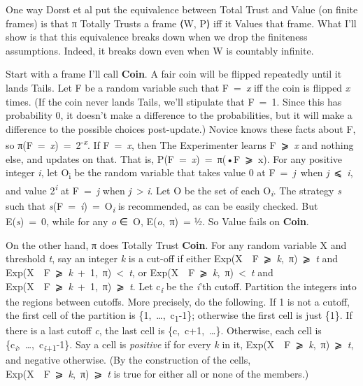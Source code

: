 \documentclass[
  10pt,
  letterpaper,
  DIV=11,
  numbers=noendperiod,
  twoside]{scrartcl}
\begin{document}
One way Dorst et al put the equivalence between Total Trust and Value
(on finite frames) is that π Totally Trusts a frame ⟨W, P⟩ iff it Values
that frame. What I'll show is that this equivalence breaks down when we
drop the finiteness assumptions. Indeed, it breaks down even when W is
countably infinite.

Start with a frame I'll call \textbf{Coin}. A fair coin will be flipped
repeatedly until it lands Tails. Let F be a random variable such that
F~=~\emph{x} iff the coin is flipped \emph{x} times. (If the coin never
lands Tails, we'll stipulate that F~=~1. Since this has probability 0,
it doesn't make a difference to the probabilities, but it will make a
difference to the possible choices post-update.) Novice knows these
facts about F, so π(F~=~\emph{x})~=~2\textsuperscript{-\emph{x}}. If
F~=~\emph{x}, then The Experimenter learns F~⩾~\emph{x} and nothing
else, and updates on that. That is,
P(F~=~\emph{x})~=~π(•\textbar F~⩾~x). For any positive integer \emph{i},
let O\textsubscript{i} be the random variable that takes value 0 at
F~=~\emph{j}~when \emph{j}~⩽~\emph{i}, and value
2\textsuperscript{\emph{i}} at F~=~\emph{j} when \emph{j}~\textgreater{}
\emph{i}. Let O be the set of each O\textsubscript{\emph{i}}. The
strategy \emph{s} such that
\emph{s}(F~=~\emph{i})~=~O\textsubscript{\emph{i}} is recommended, as
can be easily checked. But E(\emph{s})~=~0, while for any \emph{o} ∈~O,
E(\emph{o},~π)~= ½. So Value fails on \textbf{Coin}.

On the other hand, π does Totally Trust \textbf{Coin}. For any random
variable X and threshold \emph{t}, say an integer \emph{k} is a cut-off
if either Exp(X~\textbar~F~⩾~\emph{k},~π)~⩾~\emph{t} and
Exp(X~\textbar~F~⩾~\emph{k}~+~1,~π)~\textless~\emph{t}, or
Exp(X~\textbar~F~⩾~\emph{k},~π)~\textless~\emph{t} and
Exp(X~\textbar~F~⩾~\emph{k}~+~1,~π)~⩾~\emph{t}. Let
c\textsubscript{\emph{i}} be the \emph{i}'th cutoff. Partition the
integers into the regions between cutoffs. More precisely, do the
following. If 1 is not a cutoff, the first cell of the partition is
\{1,~\ldots,~c\textsubscript{1}-1\}; otherwise the first cell is just
\{1\}. If there is a last cutoff \emph{c}, the last cell is
\{c,~c+1,~\ldots\}. Otherwise, each cell is
\{c\textsubscript{\emph{i}},~\ldots,~c\textsubscript{\emph{i}+1}-1\}.
Say a cell is \emph{positive} if for every \emph{k} in it,
Exp(X~\textbar~F~⩾~\emph{k},~π)~⩾~\emph{t}, and negative otherwise. (By
the construction of the cells,
Exp(X~\textbar~F~⩾~\emph{k},~π)~⩾~\emph{t} is true for either all or
none of the members.)
\end{document}
